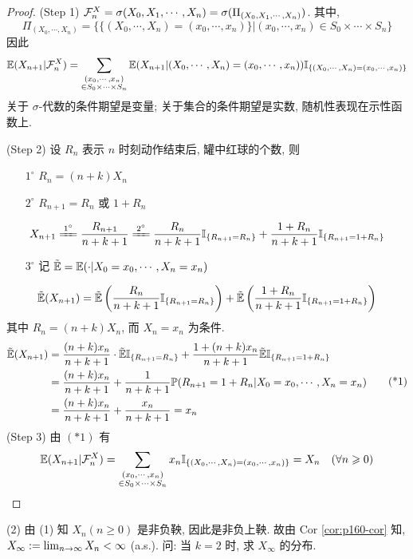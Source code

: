 \begin{proof}
(Step 1) $\mathcal{F}_n^X=\sigma(X_0,X_1,\cdots,X_n)=\sigma(\Pi_{(X_0,X_1,\cdots,X_n)})$. 其中,
\[
\Pi_{(X_0,\cdots,X_n)}=\biggl\{
\{(X_0,\cdots,X_n)=(x_0,\cdots,x_n)\}\bigg| (x_0,\cdots,x_n)\in S_0\times\cdots\times S_n    
\biggr\}
\]
因此
\[
\mathbb E(X_{n+1}|\mathcal{F}_n^X)=\sum_{\substack{(x_0,\cdots,x_n)\\ \in S_0\times \cdots\times S_n}}\mathbb E(X_{n+1}|(X_0,\cdots,X_n)= (x_0,\cdots,x_n))\mathbb I_{\{(X_0,\cdots,X_n)=(x_0,\cdots,x_n)\}}
\]
关于 $\sigma$-代数的条件期望是变量; 关于集合的条件期望是实数, 随机性表现在示性函数上.

(Step 2) 设 $R_n$ 表示 $n$ 时刻动作结束后, 罐中红球的个数, 则
\begin{itemize}
    \item[$1^\circ$] $R_n=(n+k)X_n$
    \item[$2^\circ$] $R_{n+1}=R_n$ 或 $1+R_n$
\end{itemize}
\[
X_{n+1}\xlongequal{1^\circ}\frac{R_{n+1}}{n+k+1}\xlongequal{2^\circ}\frac{R_n}{n+k+1}\II_{\{R_{n+1}=R_n\}}+\frac{1+R_n}{n+k+1}\II_{\{R_{n+1}=1+R_n\}}
\]
\begin{itemize}
    \item[$3^\circ$] 记 $\tilde{\mathbb E}=\mathbb E(\cdot|X_0=x_0,\cdots,X_n=x_n)$
\end{itemize}
\[
\tilde{\mathbb E}(X_{n+1})=\tilde{\mathbb E}\left(
    \frac{R_n}{n+k+1}\mathbb I_{\{R_{n+1}=R_n\}}
\right)+\tilde{\mathbb E}\left(
    \frac{1+R_n}{n+k+1}\mathbb I_{\{R_{n+1}=1+R_n\}}
\right)
\]
其中 $R_n=(n+k)X_n$, 而 $X_n=x_n$ 为条件.
\[
\begin{aligned}
    \tilde{\mathbb E}(X_{n+1}) &= \frac{(n+k)x_n}{n+k+1}\cdot \tilde{\mathbb E}\mathbb I_{\{R_{n+1}=R_n\}}+
    \frac{1+(n+k)x_n}{n+k+1}\tilde{\mathbb E}\mathbb I_{\{R_{n+1}=1+R_n\}}\\
    &=\frac{(n+k)x_n}{n+k+1} +\frac{1}{n+k+1}\mathbb{P}(R_{n+1}=1+R_n|X_0=x_0,\cdots,X_n=x_n)\\
    &=\frac{(n+k)x_n}{n+k+1}+\frac{x_n}{n+k+1}=x_n
\end{aligned}
\tag{*1}
\]
(Step 3) 由 $(*1)$ 有
\[
\mathbb E(X_{n+1}|\mathcal{F}_n^X)=\sum_{\substack{(x_0,\cdots,x_n)\\ \in S_0\times \cdots\times S_n}}
x_n\mathbb I_{\{(X_0,\cdots,X_n)=(x_0,\cdots,x_n)\}}=X_n\quad (\forall n\geqslant 0)
\]
\end{proof}

(2) 由 (1) 知 $X_n(n\geq 0)$ 是非负鞅, 因此是非负上鞅. 故由 Cor \ref{cor:p160-cor} 知, $X_{\infty}:=\lim_{n \to \infty}X_n<\infty$ (a.s.). 问: 当 $k=2$ 时, 求 $X_{\infty}$ 的分布.

